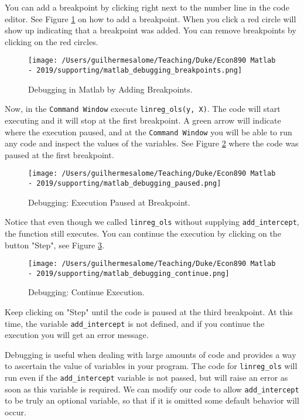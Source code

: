 \documentclass[12pt, a4paper]{article}
\begin{document}
You can add a breakpoint by clicking right next to the number line in the code editor.
See Figure \ref{fig:org71a5a7e} on how to add a breakpoint.
When you click a red circle will show up indicating that a breakpoint was added.
You can remove breakpoints by clicking on the red circles.

\begin{figure}[!ht]
\centering
\texttt{[image: /Users/guilhermesalome/Teaching/Duke/Econ890 Matlab - 2019/supporting/matlab\_debugging\_breakpoints.png]}
\caption{\label{fig:org71a5a7e}
Debugging in Matlab by Adding Breakpoints.}
\end{figure}

Now, in the \texttt{Command Window} execute \texttt{linreg\_ols(y, X)}.
The code will start executing and it will stop at the first breakpoint.
A green arrow will indicate where the execution paused, and at the \texttt{Command Window} you will be able to run any code and inspect the values of the variables.
See Figure \ref{fig:org1f5358c} where the code was paused at the first breakpoint.

\begin{figure}[!ht]
\centering
\texttt{[image: /Users/guilhermesalome/Teaching/Duke/Econ890 Matlab - 2019/supporting/matlab\_debugging\_paused.png]}
\caption{\label{fig:org1f5358c}
Debugging: Execution Paused at Breakpoint.}
\end{figure}

Notice that even though we called \texttt{linreg\_ols} without supplying \texttt{add\_intercept}, the function still executes. You can continue the execution by clicking on the button "Step", see Figure \ref{fig:orga649b58}.

\begin{figure}[!ht]
\centering
\texttt{[image: /Users/guilhermesalome/Teaching/Duke/Econ890 Matlab - 2019/supporting/matlab\_debugging\_continue.png]}
\caption{\label{fig:orga649b58}
Debugging: Continue Execution.}
\end{figure}

Keep clicking on "Step" until the code is paused at the third breakpoint.
At this time, the variable \texttt{add\_intercept} is not defined, and if you continue the execution you will get an error message.

Debugging is useful when dealing with large amounts of code and provides a way to ascertain the value of variables in your program.
The code for \texttt{linreg\_ols} will run even if the \texttt{add\_intercept} variable is not passed, but will raise an error as soon as this variable is required.
We can modify our code to allow \texttt{add\_intercept} to be truly an optional variable, so that if it is omitted some default behavior will occur.
\end{document}
